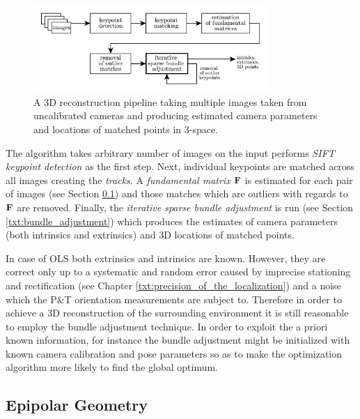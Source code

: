\begin{figure}[tbh]
	\centering
	\includegraphics[width=0.8\textwidth]{fig/3d_reconstruction_pipeline.pdf}
	\caption{A 3D reconstruction pipeline taking multiple images taken from uncalibrated cameras and producing estimated camera parameters and locations of matched points in 3-space.}
	\label{fig:3d_reconstruction_pipeline}
\end{figure}

The algorithm takes arbitrary number of images on the input performs \textit{SIFT keypoint detection} as the first step. Next, individual keypoints are matched across all images creating the \textit{tracks}. A \textit{fundamental matrix $\mathbf{F}$} is estimated for each pair of images (see Section \ref{txt:epipolar_geometry}) and those matches which are outliers with regards to $\mathbf{F}$ are removed. Finally, the \textit{iterative sparse bundle adjustment} is run (see Section \ref{txt:bundle_adjustment}) which produces the estimates of camera parameters (both intrinsics and extrinsics) and 3D locations of matched points.

In case of OLS both extrinsics and intrinsics are known. However, they are correct only up to a systematic and random error caused by imprecise stationing and rectification (see Chapter \ref{txt:precision_of_the_localization}) and a noise which the P\&T orientation measurements are subject to. Therefore in order to achieve a 3D reconstruction of the surrounding environment it is still reasonable to employ the bundle adjustment technique. In order to exploit the a priori known information, for instance the bundle adjustment might be initialized with known camera calibration and pose parameters so as to make the optimization algorithm more likely to find the global optimum.

\subsection{Epipolar Geometry} \label{txt:epipolar_geometry}

